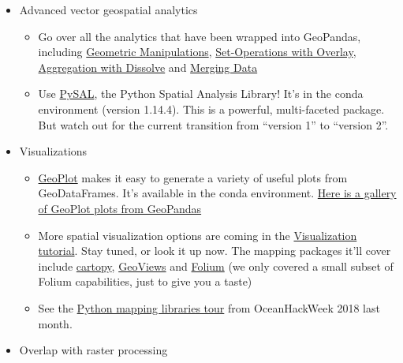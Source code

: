 \documentclass[11pt]{article}
\providecommand{\tightlist}{%
      \setlength{\itemsep}{0pt}\setlength{\parskip}{0pt}}
\begin{document}
\begin{itemize}
\tightlist
\item
  Advanced vector geospatial analytics

  \begin{itemize}
  \tightlist
  \item
    Go over all the analytics that have been wrapped into GeoPandas,
    including
    \href{http://geopandas.org/geometric_manipulations.html}{Geometric
    Manipulations},
    \href{http://geopandas.org/set_operations.html}{Set-Operations with
    Overlay},
    \href{http://geopandas.org/aggregation_with_dissolve.html}{Aggregation
    with Dissolve} and
    \href{http://geopandas.org/aggregation_with_dissolve.html}{Merging
    Data}
  \item
    Use \href{http://pysal.org}{PySAL}, the Python Spatial Analysis
    Library! It's in the conda environment (version 1.14.4). This is a
    powerful, multi-faceted package. But watch out for the current
    transition from ``version 1'' to ``version 2''.
  \end{itemize}
\item
  Visualizations

  \begin{itemize}
  \tightlist
  \item
    \href{https://residentmario.github.io/geoplot/index.html}{GeoPlot}
    makes it easy to generate a variety of useful plots from
    GeoDataFrames. It's available in the conda environment.
    \href{http://geopandas.org/gallery/plotting_with_geoplot.html}{Here
    is a gallery of GeoPlot plots from GeoPandas}
  \item
    More spatial visualization options are coming in the
    \href{https://geohackweek.github.io/visualization/}{Visualization
    tutorial}. Stay tuned, or look it up now. The mapping packages it'll
    cover include
    \href{https://scitools.org.uk/cartopy/docs/latest/}{cartopy},
    \href{http://geoviews.org/}{GeoViews} and
    \href{http://python-visualization.github.io/folium/}{Folium} (we
    only covered a small subset of Folium capabilities, just to give you
    a taste)
  \item
    See the
    \href{https://github.com/oceanhackweek/ohw2018_tutorials/tree/master/day3/geospatial_and_mapping_tools}{Python
    mapping libraries tour} from OceanHackWeek 2018 last month.
  \end{itemize}
\item
  Overlap with raster processing


\end{itemize}
\end{document}

